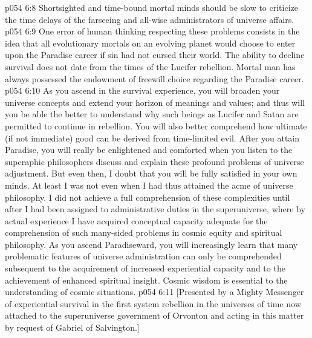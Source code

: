 \vs p054 6:8 Shortsighted and time\hyp{}bound mortal minds should be slow to criticize the time delays of the farseeing and all\hyp{}wise administrators of universe affairs.
\vs p054 6:9 One error of human thinking respecting these problems consists in the idea that all evolutionary mortals on an evolving planet would choose to enter upon the Paradise career if sin had not cursed their world. The ability to decline survival does not date from the times of the Lucifer rebellion. Mortal man has always possessed the endowment of freewill choice regarding the Paradise career.
\vs p054 6:10 \pc As you ascend in the survival experience, you will broaden your universe concepts and extend your horizon of meanings and values; and thus will you be able the better to understand why such beings as Lucifer and Satan are permitted to continue in rebellion. You will also better comprehend how ultimate (if not immediate) good can be derived from time\hyp{}limited evil. After you attain Paradise, you will really be enlightened and comforted when you listen to the superaphic philosophers discuss and explain these profound problems of universe adjustment. But even then, I doubt that you will be fully satisfied in your own minds. At least I was not even when I had thus attained the acme of universe philosophy. I did not achieve a full comprehension of these complexities until after I had been assigned to administrative duties in the superuniverse, where by actual experience I have acquired conceptual capacity adequate for the comprehension of such many\hyp{}sided problems in cosmic equity and spiritual philosophy. As you ascend Paradiseward, you will increasingly learn that many problematic features of universe administration can only be comprehended subsequent to the acquirement of increased experiential capacity and to the achievement of enhanced spiritual insight. Cosmic wisdom is essential to the understanding of cosmic situations.
\vsetoff
\vs p054 6:11 [Presented by a Mighty Messenger of experiential survival in the first system rebellion in the universes of time now attached to the superuniverse government of Orvonton and acting in this matter by request of Gabriel of Salvington.]
